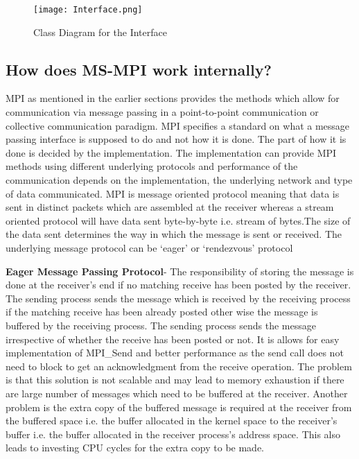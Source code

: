 \begin{figure}[ht!]
\centering
\texttt{[image: Interface.png]}
\caption{Class Diagram for the Interface}
\label{fig:InterfaceDiagram}
\end{figure}


\subsection{How does MS-MPI work internally?}

MPI as mentioned in the earlier sections provides the methods which allow for communication via message passing in a point-to-point communication or collective communication paradigm. MPI specifies a standard on what a message passing interface is supposed to do and not how it is done. The part of how it is done is decided by the implementation. The implementation can provide MPI methods using different underlying protocols and performance of the communication depends on the implementation, the underlying network and type of data communicated. MPI is message oriented protocol meaning that data is sent in distinct packets which are assembled at the receiver whereas a stream oriented protocol will have data sent byte-by-byte i.e. stream of bytes.The size of the data sent determines the way in which the message is sent or received. The underlying message protocol can be {\lq}eager{\rq} or {\lq}rendezvous{\rq} protocol\newline 

\textbf{Eager Message Passing Protocol}- The responsibility of storing the message is done at the receiver's end if no matching receive has been posted by the receiver. The sending process sends the message which is received by the receiving process if the matching receive has been already posted other wise the message is buffered by the receiving process. The sending process sends the message irrespective of whether the receive has been posted or not. It is allows for easy implementation of MPI\_Send and better performance as the send call does not need to block to get an acknowledgment from the receive operation. The problem is that this solution is not scalable and may lead to memory exhaustion if there are large number of messages which need to be buffered at the receiver. Another problem is the extra copy of the buffered message is required at the receiver from the buffered space i.e. the buffer allocated in the kernel space to the receiver's buffer i.e. the buffer allocated  in the receiver process's address space. This also leads to investing CPU cycles for the extra copy to be made.       

